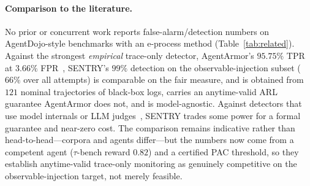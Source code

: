 \documentclass[pdflatex,sn-mathphys-num]{sn-jnl}%
\theoremstyle{thmstyleone}%
\theoremstyle{thmstyletwo}%
\theoremstyle{thmstylethree}%
\begin{document}
\paragraph{Comparison to the literature.} No prior or concurrent work reports
false-alarm/detection numbers on AgentDojo-style benchmarks with an e-process
method (Table~\ref{tab:related}). Against the strongest \emph{empirical}
trace-only detector, AgentArmor's \(95.75\%\) TPR at \(3.66\%\)
FPR~\cite{wang2025agentarmor}, SENTRY's \(99\%\) detection on the
observable-injection subset (\(66\%\) over all attempts) is comparable on the
fair measure, and is obtained from \(121\) nominal trajectories of black-box
logs, carries an anytime-valid ARL guarantee AgentArmor does not, and is
model-agnostic. Against detectors that use model internals or LLM
judges~\cite{belenky2026cheap,liu2025datasentinel,jia2024taskshield}, SENTRY
trades some power for a formal guarantee and near-zero cost. The comparison
remains indicative rather than head-to-head---corpora and agents differ---but
the numbers now come from a competent agent (\(\tau\)-bench reward \(0.82\))
and a certified PAC threshold, so they establish anytime-valid trace-only
monitoring as genuinely competitive on the observable-injection target, not
merely feasible.
\end{document}

